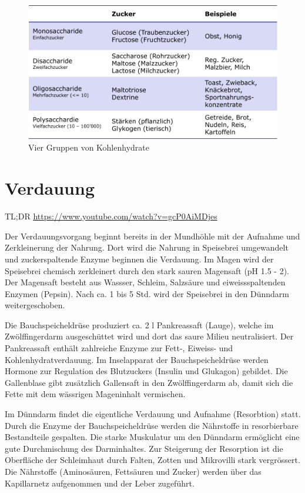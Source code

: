 \begin{figure}
\centering
\includegraphics[width=0.7\linewidth]{fig/kohlenhydrate}
\caption{Vier Gruppen von Kohlenhydrate}
\label{fig:kohlenhydrate}
\end{figure}

\section{Verdauung}

TL;DR \href{https://www.youtube.com/watch?v=gcP0AiMDjes}{https://www.youtube.com/watch?v=gcP0AiMDjes}

Der Verdauungsvorgang beginnt bereits in der Mundhöhle mit der Aufnahme und Zerkleinerung der Nahrung. Dort wird die Nahrung in Speisebrei umgewandelt und zuckerspaltende Enzyme beginnen die Verdauung. Im Magen wird der Speisebrei chemisch zerkleinert durch den stark sauren Magensaft (pH 1.5 - 2). Der Magensaft besteht aus Wassser, Schleim, Salzsäure und eiweissspaltenden Enzymen (Pepsin). Nach ca. 1 bis 5 Std. wird der Speisebrei in den Dünndarm weitergeschoben. 

Die Bauchspeicheldrüse produziert ca. 2 l Pankreassaft (Lauge), welche im Zwölffingerdarm ausgeschüttet wird und dort das saure Milieu neutralisiert. Der Pankreassaft enthält zahlreiche Enzyme zur Fett-, Eiweiss- und Kohlenhydratverdauung. Im Inselapparat der Bauchspeicheldrüse werden Hormone zur Regulation des Blutzuckers (Insulin und Glukagon) gebildet. Die Gallenblase gibt zusätzlich Gallensaft in den Zwölffingerdarm ab, damit sich die Fette mit dem wässrigen Mageninhalt vermischen.

Im Dünndarm findet die eigentliche Verdauung und Aufnahme (Resorbtion) statt. Durch die Enzyme der Bauchspeicheldrüse werden die Nährstoffe in resorbierbare Bestandteile gespalten. Die starke Muskulatur um den Dünndarm ermöglicht eine gute Durchmischung des Darminhaltes. Zur Steigerung der Resorption ist die Oberfläche der Schleimhaut durch Falten, Zotten und Mikrovilli stark vergrössert. Die Nährstoffe (Aminosäuren, Fettsäuren und Zucker) werden über das Kapillarnetz aufgenommen und der Leber zugeführt.

